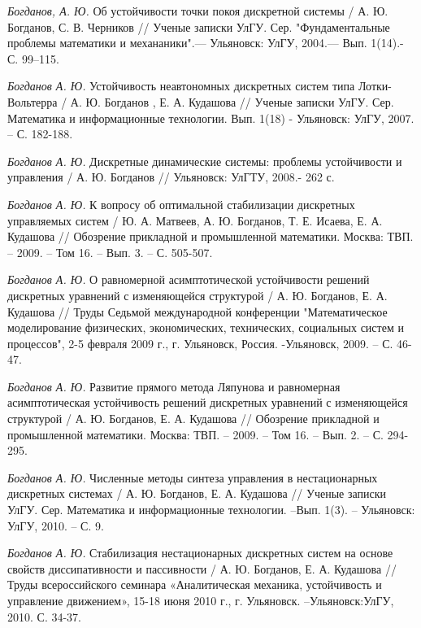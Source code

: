 \begin{thebibliography}{10}
	{\it Богданов, А. Ю.} Об устойчивости точки покоя дискретной системы / А. Ю. Богданов, С. В. Черников // Ученые записки УлГУ. Сер. "Фундаментальные проблемы математики и механаники".— Ульяновск: УлГУ, 2004.— Вып. 1(14).- С. 99–115.
	

	{\it Богданов А. Ю.} Устойчивость неавтономных дискретных систем типа Лотки-Вольтерра / А. Ю. Богданов , Е. А. Кудашова //
	Ученые записки УлГУ. Сер. Математика и информационные технологии. Вып. 1(18) - Ульяновск: УлГУ, 2007. – С. 182-188.
	
	{\it Богданов А. Ю.} Дискретные динамические системы: проблемы устойчивости и управления / А. Ю. Богданов //
	Ульяновск: УлГТУ, 2008.- 262 с.
	
	{\it Богданов А. Ю.} К вопросу об оптимальной стабилизации дискретных управляемых систем / Ю. А. Матвеев, А. Ю. Богданов, Т. Е. Исаева, Е. А. Кудашова  //
	Обозрение прикладной и промышленной математики.  Москва: ТВП. – 2009. – Том 16. – Вып. 3. – С. 505-507.
	
	{\it Богданов А. Ю.} О равномерной асимптотической устойчивости решений дискретных уравнений с изменяющейся структурой / А. Ю. Богданов, Е. А. Кудашова //
	Труды Седьмой международной конференции "Математическое моделирование физических, экономических, технических, социальных систем и процессов", 2-5 февраля 2009 г., г. Ульяновск, Россия. -Ульяновск, 2009. – С. 46-47.
	
	{\it Богданов А. Ю.} Развитие прямого метода Ляпунова и равномерная асимптотическая устойчивость решений дискретных уравнений с изменяющейся структурой / А. Ю. Богданов, Е. А. Кудашова //
	Обозрение прикладной и промышленной математики.  Москва: ТВП. – 2009. – Том 16. – Вып. 2. – С. 294-295.
	
	{\it Богданов А. Ю.} Численные методы синтеза управления в нестационарных дискретных системах / А. Ю. Богданов, Е. А. Кудашова //
	Ученые записки УлГУ. Сер. Математика и информационные технологии. –Вып. 1(3). – Ульяновск: УлГУ, 2010. – С. 9.
	
	{\it Богданов А. Ю.} Стабилизация нестационарных дискретных систем на основе свойств диссипативности и пассивности / А. Ю. Богданов, Е. А. Кудашова //
	Труды всероссийского семинара «Аналитическая механика, устойчивость и управление движением», 15-18 июня 2010 г., г. Ульяновск. –Ульяновск:УлГУ, 2010. С. 34-37.
	

\end{thebibliography}
